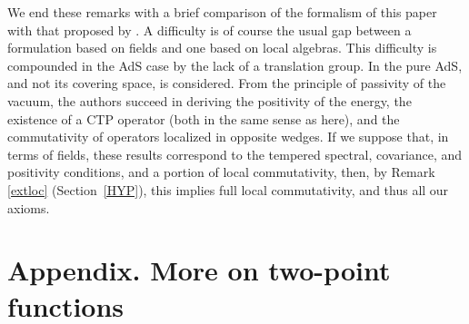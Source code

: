 \documentclass[a4paper,a4paper]{article}
\let\UnmodifSec=\section
\renewcommand{\section}{\setcounter{equation}{0}\UnmodifSec}
\begin{document}
We end these remarks
with a brief comparison of the formalism of this paper
with that proposed by \cite{BFS}. A difficulty is of course the usual gap
between a formulation based on fields and one based on local
algebras. This difficulty is compounded in the AdS case by the
lack of a translation group. In \cite{BFS} the pure AdS, and
not its covering space, is considered. From the principle of
passivity of the vacuum, the authors succeed in deriving the positivity
of the energy, the existence of a CTP operator (both in the same sense
as here), and the commutativity of operators localized in opposite
wedges. If we suppose that, in terms of fields, these results
correspond to the tempered spectral, covariance, and
positivity conditions, and a portion of
local commutativity, then, by Remark \ref{extloc} (Section~\ref{HYP}),
this implies
full local commutativity, and thus all our axioms.














\def\varcm{truecm}
\appendix
\section{Appendix. More on two-point functions}
\label{ap2pt}
\end{document}
